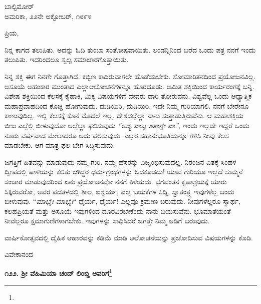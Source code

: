 \vspace{-0.5cm}

\begin{flushright}
ಬಾಲ್ಟಿಮೋರ್\\ಅಮರಿಕಾ, ೨೨ನೇ ಅಕ್ಟೋಬರ್, ೧೮೯೪
\end{flushright}

\vspace{-0.5cm}

\noindent
ಪ್ರಿಯ,

ನಿನ್ನ ಕಾಗದ ತಲುಪಿತು. ಅದನ್ನು ಓದಿ ತುಂಬಾ ಸಂತೋಷವಾಯಿತು. ಲಂಡನ್ನಿನಿಂದ ಬರೆದ ಒಂದು ಪತ್ರ ನನಗೆ ಇಂದು ತಲುಪಿತು. ಇದರಿಂದಲೂ ಸ್ವಲ್ಪ ಸಮಾಚಾರ\break ಗೊತ್ತಾಯಿತು.

ನಿನ್ನ ಶಕ್ತಿ ಈಗ ನಿನಗೇ ಗೊತ್ತಾಗಿದೆ. ಕಬ್ಬಿಣ ಕಾದಿರುವಾಗಲೇ ಹೊಡೆಯಬೇಕು. ಸೋಮಾರಿತನದಿಂದ ಪ್ರಯೋಜನವಿಲ್ಲ. ಅಸೂಯೆ ಅಹಂಕಾರ ಮುಂತಾದ ಎಲ್ಲಾ\break ಆಲೋಚನೆಗಳನ್ನೂ ಹೊರದೂಡು. ಅಮಿತ ಶಕ್ತಿಯಿಂದ ಕಾರ್ಯರಂಗಕ್ಕೆ ಬನ್ನಿ. ವಿಶೇಷ ಶಕ್ತಿಯಿಂದ ಕೆಲಸಕ್ಕೆ ಕೈಹಾಕಿ, ಮಿಕ್ಕ ವಿಷಯಗಳಿಗೆ ದೇವರು ದಾರಿ ತೋರುವನು. ವಿಶ್ವವೆಲ್ಲ ಒಂದು ಆಧ್ಯಾತ್ಮಿಕ ಮಹಾಪ್ರವಾಹದಿಂದ ಕೊಚ್ಚಿ ಹೋಗುವುದು. ದುಡಿಯಿರಿ, ದುಡಿಯಿರಿ. ಇದೇ ನಿಮ್ಮ ಗುರಿಯಾಗಲಿ. ನನಗೆ ಬೇರೇನೂ ಕಾಣುವುದಿಲ್ಲ. ಇಲ್ಲಿ ಕೆಲಸಕ್ಕೆ ಕೊನೆ ಮೊದಲೆ ಇಲ್ಲ. ದೇಶದಲ್ಲೆಲ್ಲಾ ನಾನು ಸುತ್ತಾಡುತ್ತಿರುವೆನು. ಆ ಮಹಾಶಕ್ತಿಯ ಬೀಜ ಎಲ್ಲೆಲ್ಲಿ ಬೀಳುವುದೋ ಅಲ್ಲೆಲ್ಲಾ ಫಲಿಸುವುದು\enginline{-} \textit{“ಅದ್ಯ ವಾಬ್ದ ಶತಾನ್ತೇ ವಾ”, } ಇಂದು ಇಲ್ಲದೇ ಇದ್ದರೆ ಒಂದು ನೂರು ವರ್ಷವಾದ ಮೇಲಾದರೂ ಅದು ಫಲಿಸುವುದು. ಎಲ್ಲರ ಸಹಾನುಭೂತಿಯನ್ನೂ ಗಳಿಸಿ ನೀವು ಕೆಲಸ ಮಾಡಬೇಕು. ಆಗ ಮಾತ್ರ ಫಲ ಬೇಗ ಸಿದ್ಧಿಸುವುದು.

ಜಗತ್ತಿಗೆ ಹಿತವನ್ನು ಮಾಡುವುದು ನಮ್ಮ ಗುರಿ. ನಮ್ಮ ಹೆಸರನ್ನು ವಿಜೃಂಭಿಸುವುದಲ್ಲ. ನಿರಂಜನ ಏತಕ್ಕೆ ಸಿಂಹಳ ದ್ವೀಪದಲ್ಲಿ ಪಾಳಿಯನ್ನು ಕಲಿತು ಬೌದ್ಧರ ಧರ್ಮಗ್ರಂಥಗಳನ್ನು ಓದಕೂಡದು! ಯಾವ ಗುರಿಯೂ ಇಲ್ಲದೆ ಸುಮ್ಮನೆ ಸಂಚಾರ ಮಾಡುವುದರಿಂದ ಏನು ಪ್ರಯೋಜನವೋ ನನಗೆ ತಿಳಿಯದು. ಭಗವಂತನ ಕೃಪಾಶ್ರಯಕ್ಕೆ ಯಾರು ಸಿಕ್ಕಿರುವರೋ, ಅವರ ಪದತಳದಲ್ಲಿ ಶೀಲ, ಐಶ್ವರ್ಯ, ಎಲ್ಲ ಬಯಕೆಗಳ ಸಿದ್ದಿ, ಸ್ವಾತಂತ್ರ್ಯ ಇವುಗಳೆಲ್ಲ ಬಂದು ಬೀಳುವುವು. “\textit{ಮಾಭೈಃ ಮಾಭೈಃ}“ ಧೈರ್ಯ, ಧೈರ್ಯ! ಎಲ್ಲವೂ ಕ್ರಮೇಣ ಬರುವುದು. ನೀವುಗಳೆಲ್ಲರೂ ಸ್ವಾರ್ಥ, ಕಲಹಪ್ರಿಯತೆ ಮತ್ತು ಅಸೂಯೆ ಇವುಗಳಿಂದ ದೂರ\break ವಿರಬೇಕೆಂದು ನಾನು ಬಯಸುವೆನು. ಭೂಮಾತೆಯಂತೆ ನೀವೆಲ್ಲರೂ ಕ್ಷಮಾಗುಣಿಗಳಾಗಬೇಕು. ಇವುಗಳನ್ನು ಸಾಧಿಸಿದರೆ ಜಗತ್ತೇ ನಿಮ್ಮ ಅಡಿಗೆ ಬರುವುದು.

ವಾರ್ಷಿಕೋತ್ಸವದಲ್ಲಿ ದೈಹಿಕ ಆಹಾರವನ್ನು ಕಡಿಮೆ ಮಾಡಿ ಆಲೋಚನೆಯನ್ನು ಪ್ರಚೋದಿಸುವ ವಿಷಯಗಳನ್ನು ಕೊಡಿ.

\vspace{-0.5cm}

{\flushright
ವಿವೇಕಾನಂದ\par}

\begin{center}
\textbf{೧೨೨. ಶ‍್ರೀ ವೆಹಿಮಿಯಾ ಚಂದ್ ಲಿಂಬ್ಡಿ ಅವರಿಗೆ}\footnote{}
\end{center}

\vspace{-0.5cm}

